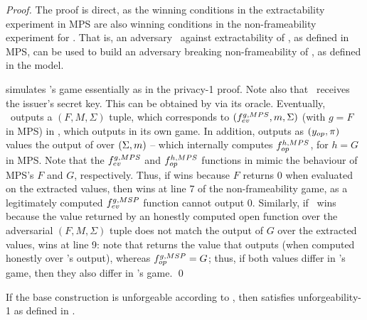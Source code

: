 \begin{proof}  
  The proof is direct, as the winning conditions in the extractability
  experiment in MPS are also winning conditions in the non-frameability
  experiment for \UAS. That is, an adversary \adv~against extractability of
  \CUASMPS, as defined in MPS, can be used to build an adversary \advB breaking
  non-frameability of \CUASGen, as defined in the \UAS model.

  \advB simulates \adv's game essentially as in the privacy-1 proof. Note also
  that \adv~receives the issuer's secret key. This can be obtained by \advB via
  its \ICORR oracle. Eventually, \adv~outputs a $(F,M,\Sigma)$ tuple, which
  corresponds to $(f_{ev}^{g,MPS},m,\Sigma)$ (with $g=F$ in MPS) in \CUASGen,
  which \advB outputs in its own game. In addition, \advB outputs as $(y_{op},
  \pi)$ values the output of \Open over $(\Sigma,m)$ -- which internally
  computes $f_{op}^{h,MPS}$, for $h=G$ in MPS.
  Note that the $f_{ev}^{g,MPS}$ and $f_{op}^{h,MPS}$ functions in \CUASMPS
  mimic the behaviour of MPS's $F$ and $G$, respectively. Thus, if \adv wins
  because $F$ returns $0$ when evaluated on the extracted values, then \advB
  wins at line 7 of the non-frameability game, as a legitimately computed
  $f_{ev}^{g,MSP}$ function cannot output $0$. Similarly, if \adv~wins because
  the value returned by an honestly computed open function over the adversarial
  $(F,M,\Sigma)$ tuple does not match the output of $G$ over the extracted
  values, \advB wins at line 9: note that \advB returns the \yinsp value that
  \Open outputs (when computed honestly over \adv's output), whereas
  $f_{op}^{g,MSP}=G$; thus, if both values differ in \adv's game, then they also
  differ in \advB's game.
  \qed
\end{proof}

\begin{theorem}
  If the base \CUASGen construction is unforgeable according to
  , then \CUASMPS satisfies unforgeability-1 as defined in
  \cite{ngsy22}.
\end{theorem}

